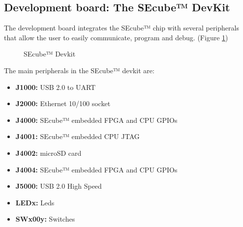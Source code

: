 \subsection{Development board: The SEcube™ DevKit}

The development board integrates the SEcube™ chip with several peripherals that allow the user to easily communicate, program and debug. (Figure \ref{fig:devboard})

\begin{figure}[ht]
  \centering
  \caption{SEcube™ Devkit}
 \label{fig:devboard}
\end{figure}

The main peripherals in the SEcube™ devkit are:

\begin{itemize}
\setlength\itemsep{-3pt}
\item \textbf{J1000: }\tabto{2.3cm} USB 2.0 to UART 
\item \textbf{J2000: }\tabto{2.3cm} Ethernet 10/100 socket 
\item \textbf{J4000: }\tabto{2.3cm} SEcube™ embedded FPGA and CPU GPIOs
\item \textbf{J4001: }\tabto{2.3cm} SEcube™ embedded CPU JTAG
\item \textbf{J4002: }\tabto{2.3cm} microSD card 
\item \textbf{J4004: }\tabto{2.3cm} SEcube™ embedded FPGA and CPU GPIOs
\item \textbf{J5000: }\tabto{2.3cm} USB 2.0 High Speed 
\item \textbf{LEDx:  }\tabto{2.3cm} Leds 
\item \textbf{SWx00y:}\tabto{2.3cm} Switches 
\end{itemize}

